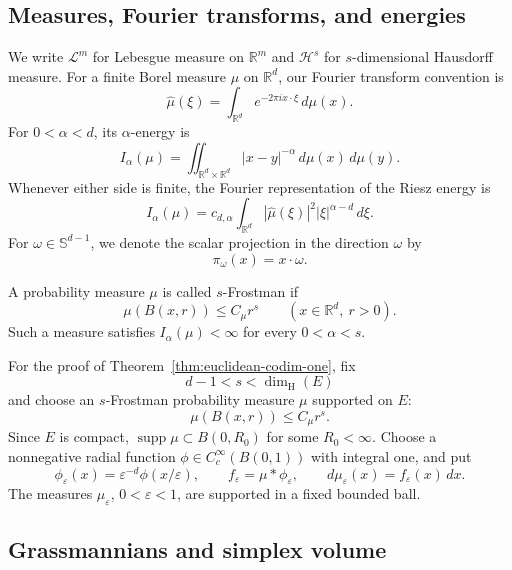 \documentclass[11pt]{article}
\theoremstyle{remark}
\newcommand{\R}{\mathbb R}
\newcommand{\Sph}{\mathbb S}
\newcommand{\cL}{\mathcal L}
\newcommand{\cH}{\mathcal H}
\newcommand{\supp}{\operatorname{supp}}
\newcommand{\eps}{\varepsilon}
\newcommand{\wh}{\widehat}
\numberwithin{equation}{section}
\newcommand{\1}{\mathbf 1}
\begin{document}
\subsection{Measures, Fourier transforms, and energies}

We write \(\cL^m\) for Lebesgue measure on \(\R^m\) and
\(\cH^s\) for \(s\)-dimensional Hausdorff measure. For a finite Borel
measure \(\mu\) on \(\R^d\), our Fourier transform convention is
\[
        \wh\mu(\xi)
        =
        \int_{\R^d}e^{-2\pi i x\cdot\xi}\,d\mu(x).
\]
For \(0<\alpha<d\), its \(\alpha\)-energy is
\begin{equation}
 I_\alpha(\mu)
 =
 \iint_{\R^d\times\R^d}
 |x-y|^{-\alpha}\,d\mu(x)\,d\mu(y).
\label{eq:riesz-energy}
\end{equation}
Whenever either side is finite, the Fourier representation of the
Riesz energy is
\begin{equation}
 I_\alpha(\mu)
 =
 c_{d,\alpha}
 \int_{\R^d}
 |\wh\mu(\xi)|^2|\xi|^{\alpha-d}\,d\xi.
\label{eq:riesz-energy-fourier}
\end{equation}
For \(\omega\in\Sph^{d-1}\), we denote the scalar projection in the
direction \(\omega\) by
\[
        \pi_\omega(x)=x\cdot\omega.
\]

A probability measure \(\mu\) is called \(s\)-Frostman if
\[
        \mu(B(x,r))\le C_\mu r^s
        \qquad (x\in\R^d,\ r>0).
\]
Such a measure satisfies \(I_\alpha(\mu)<\infty\) for every
\(0<\alpha<s\).

For the proof of Theorem~\ref{thm:euclidean-codim-one}, fix
\[
        d-1<s<\dim_{\mathrm H}(E)
\]
and choose an \(s\)-Frostman probability measure \(\mu\) supported on
\(E\):
\begin{equation}
        \mu(B(x,r))\le C_\mu r^s.
\label{eq:frostman}
\end{equation}
Since \(E\) is compact, \(\supp\mu\subset B(0,R_0)\) for some
\(R_0<\infty\). Choose a nonnegative radial function
\(\phi\in C_c^\infty(B(0,1))\) with integral one, and put
\begin{equation}
 \phi_\eps(x)=\eps^{-d}\phi(x/\eps),
 \qquad
 f_\eps=\mu*\phi_\eps,
 \qquad
 d\mu_\eps(x)=f_\eps(x)\,dx.
\label{eq:mollification}
\end{equation}
The measures \(\mu_\eps\), \(0<\eps<1\), are supported in a fixed
bounded ball.

\subsection{Grassmannians and simplex volume}
\end{document}
